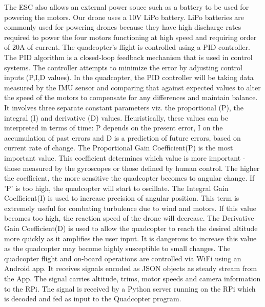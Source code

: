 \newline
The ESC also allows an external power souce such as a battery to be used for powering the motors. Our drone uses a 10V LiPo battery. LiPo batteries are commonly used for powering drones because they have high discharge rates required to power the four motors functioning at high speed and requiring order of 20A of current. 
\newline
\newline
The quadcopter's flight is controlled using a PID controller. The PID algorithm is a closed-loop feedback mechanism that is used in control systems. The controller attempts to minimize the error by adjusting control inputs (P,I,D values). In the quadcopter, the PID controller will be taking data measured by the IMU sensor and comparing that against expected values to alter the speed of the motors to compensate for any differences and maintain balance. It involves three separate constant parameters viz. the proportional (P), the integral (I) and derivative (D) values. Heuristically, these values can be interpreted in terms of time: P depends on the present error, I on the accumulation of past errors and D is a prediction of future errors, based on current rate of change.
\newline
\newline
The Proportional Gain Coefficient(P) is the most important value. This coefficient determines which value is more important - those measured by the gyroscopes or those defined by human control. The higher the coefficient, the more sensitive the quadcopter becomes to angular change. If 'P' is too high, the quadcopter will start to oscillate. 
\newline
\newline
The Integral Gain Coefficient(I) is used to increase precision of angular position. This term is extremely useful for combating turbulence due to wind and motors. If this value becomes too high, the reaction speed of the drone will decrease.
\newline
\newline
The Derivative Gain Coefficient(D) is used to allow the quadcopter to reach the desired altitude more quickly as it amplifies the user input. It is dangerous to increase this value as the quadcopter may become highly susceptible to small changes.
\newline
\newline
The quadcopter flight and on-board operations are controlled via WiFi using an Android app. It receives signals encoded as JSON objects as steady stream from the App. The signal carries altitude, trims, motor speeds and camera information to the RPi. The signal is received by a Python server running on the RPi which is decoded and fed as input to the Quadcopter program.  
